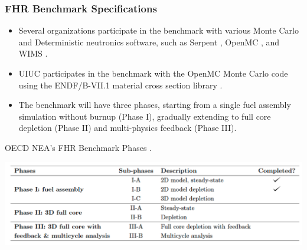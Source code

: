 \begin{frame}
    \frametitle{FHR Benchmark Specifications}
    \begin{itemize}
        \item Several organizations participate in the benchmark with various Monte Carlo
        and Deterministic neutronics software, such as Serpent \cite{leppanen_serpent_2014}, 
        OpenMC \cite{romano_openmc_2013}, and WIMS \cite{lindley_current_2017}. 
        \item UIUC participates in the benchmark with the OpenMC Monte Carlo code 
        \cite{romano_openmc_2013} using the ENDF/B-VII.1 material cross section library 
        \cite{chadwick_endf/b-vii.1_2011}.
        \item The benchmark will have three phases, starting from a single fuel assembly
        simulation without burnup (Phase I), gradually extending to full core depletion
        (Phase II) and multi-physics feedback (Phase III). 
    \end{itemize}
    \vspace{-0.2cm}
    \begin{table}
        \caption{OECD NEA's FHR Benchmark Phases 
        \cite{petrovic_benchmark_2021}.}
        \vspace{-0.25cm}
        \includegraphics[width=0.9\linewidth]{figures/benchmark-phases.png} 
    \end{table}
\end{frame}

